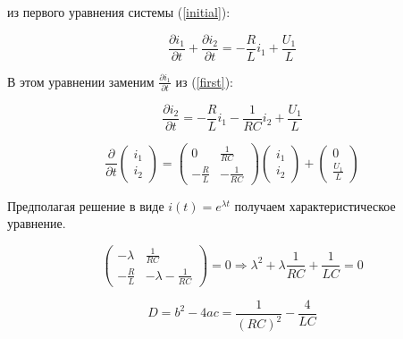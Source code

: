 \documentclass[a4paper,12pt]{article}
\begin{document}
из первого уравнения системы (\ref{initial}):

$$
\frac{\partial i_1}{\partial t} + \frac{\partial i_2}{\partial t} = -\frac{R}{L} i_1 + \frac{U_1}{L} 
$$










В этом уравнении заменим $\frac{\partial i_1}{\partial t}$ из (\ref{first}):

$$
\frac{\partial i_2}{\partial t} = - \frac{R}{L} i_1 - \frac{1}{RC} i_2 + \frac{U_1}{L}
$$

\begin{equation}
\frac{\partial}{\partial t}\!\left(\begin{array}{c}i_1\\[1.5mm]i_2\end{array}\right) =
	\left(\begin{array}{cc}0&\frac{1}{RC}\\[1.5mm] -\frac{R}{L}&-\frac{1}{RC}\end{array}\right)
		\left(\begin{array}{c}i_1\\[1.5mm]i_2\end{array}\right)
		+
	\left(\begin{array}{c}0\\[1.5mm]\frac{U_1}{L}\end{array}\right)
\end{equation}

Предполагая решение в виде $i(t) = e^{\lambda t}$ получаем характеристическое уравнение.

$$
\left(\begin{array}{cc}-\lambda & \frac{1}{RC}\\[1.5mm] -\frac{R}{L} & -\lambda -\frac{1}{RC}\end{array}\right) =0  \Rightarrow \lambda^2 + \lambda \frac{1}{RC} + \frac{1}{LC} =0
$$

$$
D = b^2 - 4ac = \frac{1}{(RC)^2} - \frac{4}{LC}
$$
\end{document}
